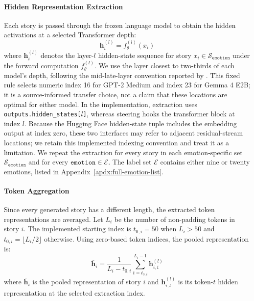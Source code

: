 \paragraph{Hidden Representation Extraction} Each story is passed through the frozen language model to obtain the hidden
activations at a selected Transformer depth:
\begin{equation}
    \mathbf{h}_i^{(l)} = f_\theta^{(l)}(x_i)
    \label{eqtn:hidden-representation}
\end{equation}
where $\mathbf{h}_i^{(l)}$ denotes the layer-$l$ hidden-state sequence for story $x_i\in\mathcal{S}_\mathtt{emotion}$ under
the forward computation $f_\theta^{(l)}$. We use the layer closest to two-thirds of each model's depth, following the mid-late-layer convention reported 
by \cite{sofroniew_emotion_2026}. This fixed rule selects numeric index 16 for GPT-2 Medium and index 23 for Gemma 4 E2B; it is a source-informed 
transfer choice, not a claim that these locations are optimal for either model. In the implementation, extraction uses \texttt{outputs.hidden\_states[$l$]}, 
whereas steering hooks the transformer block at index $l$. Because the Hugging Face hidden-state tuple includes the embedding output at index zero, 
these two interfaces may refer to adjacent residual-stream locations; we retain this implemented indexing convention and treat it as a limitation.
We repeat the extraction for every story in each emotion-specific set $\mathcal{S}_\mathtt{emotion}$ and for every
$\mathtt{emotion}\in\mathcal{E}$. The label set $\mathcal{E}$ contains either nine or twenty emotions, listed in
Appendix~\ref{apdx:full-emotion-list}.

\paragraph{Token Aggregation} Since every generated story has a different length, the extracted token representations are averaged. Let $L_i$ be 
the number of non-padding tokens in story $i$. The implemented starting index is $t_{0,i}=50$ when $L_i>50$ and $t_{0,i}=\lfloor L_i/2\rfloor$ otherwise. 
Using zero-based token indices, the pooled representation is:
\begin{equation}
    \mathbf{\overline{h}}_i=\frac{1}{L_i-t_{0,i}}\sum_{t=t_{0,i}}^{L_i-1}\mathbf{h}_{i,t}^{(l)}
    \label{eqtn:token-aggr}
\end{equation}
where $\mathbf{\overline{h}}_i$ is the pooled representation of story $i$ and $\mathbf{h}_{i,t}^{(l)}$ is its token-$t$ hidden representation at 
the selected extraction index.

